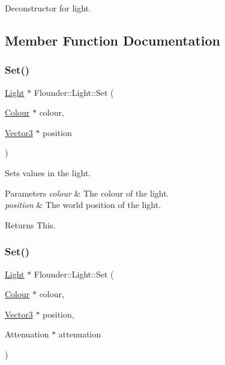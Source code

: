 Deconstructor for light. 



\subsection{Member Function Documentation}
\mbox{\label{class_flounder_1_1_light_ab1d4b3068b9185e6b539d9f824bf042b}} 
\subsubsection{\texorpdfstring{Set()}{Set()}\hspace{0.1cm}{\footnotesize\ttfamily [1/2]}}
{\footnotesize\ttfamily \hyperlink{class_flounder_1_1_light}{Light} $\ast$ Flounder\+::\+Light\+::\+Set (\begin{DoxyParamCaption}\item[{\hyperlink{class_flounder_1_1_colour}{Colour} $\ast$}]{colour,  }\item[{\hyperlink{class_flounder_1_1_vector3}{Vector3} $\ast$}]{position }\end{DoxyParamCaption})}



Sets values in the light. 


\begin{DoxyParams}{Parameters}
{\em colour} & The colour of the light. \\
\hline
{\em position} & The world position of the light. \\
\hline
\end{DoxyParams}
\begin{DoxyReturn}{Returns}
This. 
\end{DoxyReturn}
\mbox{\label{class_flounder_1_1_light_afc1694efa60f859c03dc9e0996b9dc70}} 
\subsubsection{\texorpdfstring{Set()}{Set()}\hspace{0.1cm}{\footnotesize\ttfamily [2/2]}}
{\footnotesize\ttfamily \hyperlink{class_flounder_1_1_light}{Light} $\ast$ Flounder\+::\+Light\+::\+Set (\begin{DoxyParamCaption}\item[{\hyperlink{class_flounder_1_1_colour}{Colour} $\ast$}]{colour,  }\item[{\hyperlink{class_flounder_1_1_vector3}{Vector3} $\ast$}]{position,  }\item[{Attenuation $\ast$}]{attenuation }\end{DoxyParamCaption})}



